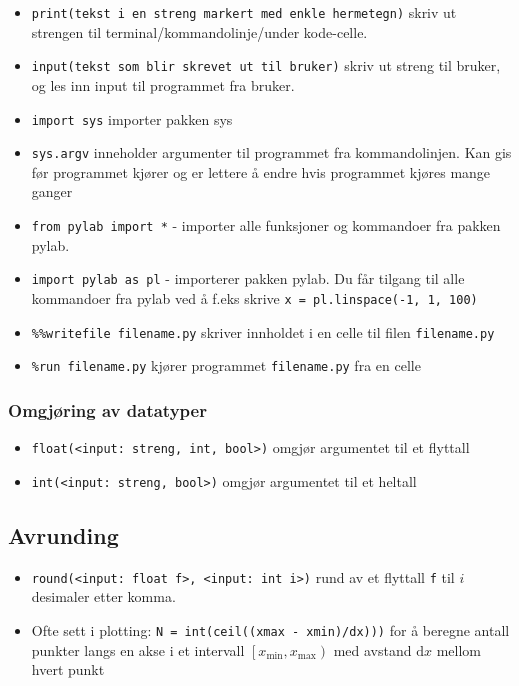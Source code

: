 \documentclass[11pt]{article}
\providecommand{\tightlist}{%
      \setlength{\itemsep}{0pt}\setlength{\parskip}{0pt}}
\begin{document}
\begin{itemize}
\tightlist
\item
  \texttt{print(\textquotesingle{}tekst\ i\ en\ streng\ markert\ med\ enkle\ hermetegn\textquotesingle{})}
  skriv ut strengen til terminal/kommandolinje/under kode-celle.
\item
  \texttt{input(\textquotesingle{}tekst\ som\ blir\ skrevet\ ut\ til\ bruker)}
  skriv ut streng til bruker, og les inn input til programmet fra
  bruker.
\item
  \texttt{import\ sys} importer pakken sys
\item
  \texttt{sys.argv} inneholder argumenter til programmet fra
  kommandolinjen. Kan gis før programmet kjører og er lettere å endre
  hvis programmet kjøres mange ganger
\item
  \texttt{from\ pylab\ import\ *} - importer alle funksjoner og
  kommandoer fra pakken pylab.
\item
  \texttt{import\ pylab\ as\ pl} - importerer pakken pylab. Du får
  tilgang til alle kommandoer fra pylab ved å f.eks skrive
  \texttt{x\ =\ pl.linspace(-1,\ 1,\ 100)}
\item
  \texttt{\%\%writefile\ filename.py} skriver innholdet i en celle til
  filen \texttt{filename.py}
\item
  \texttt{\%run\ filename.py} kjører programmet \texttt{filename.py} fra
  en celle
\end{itemize}

\hypertarget{omgjuxf8ring-av-datatyper}{%
\subsubsection{Omgjøring av datatyper}\label{omgjuxf8ring-av-datatyper}}

\begin{itemize}
\tightlist
\item
  \texttt{float(\textless{}input:\ streng,\ int,\ bool\textgreater{})}
  omgjør argumentet til et flyttall
\item
  \texttt{int(\textless{}input:\ streng,\ bool\textgreater{})} omgjør
  argumentet til et heltall
\end{itemize}

\hypertarget{avrunding}{%
\subsection{Avrunding}\label{avrunding}}

\begin{itemize}
\item
  \texttt{round(\textless{}input:\ float\ f\textgreater{},\ \textless{}input:\ int\ i\textgreater{})}
  rund av et flyttall \texttt{f} til \(i\) desimaler etter komma.
\item
  Ofte sett i plotting: \texttt{N\ =\ int(ceil((xmax\ -\ xmin)/dx)))}
  for å beregne antall punkter langs en akse i et intervall
  \(\left[x_{\text{min}}, x_{\text{max}}\right)\) med avstand
  \(\text{d}x\) mellom hvert punkt
\end{itemize}
\end{document}
